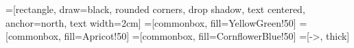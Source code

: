 =[rectangle, draw=black, rounded corners, drop shadow,
	text centered, anchor=north, text width=2cm]
=[commonbox, fill=YellowGreen!50]
=[commonbox, fill=Apricot!50]
=[commonbox, fill=CornflowerBlue!50]
=[->, thick]
